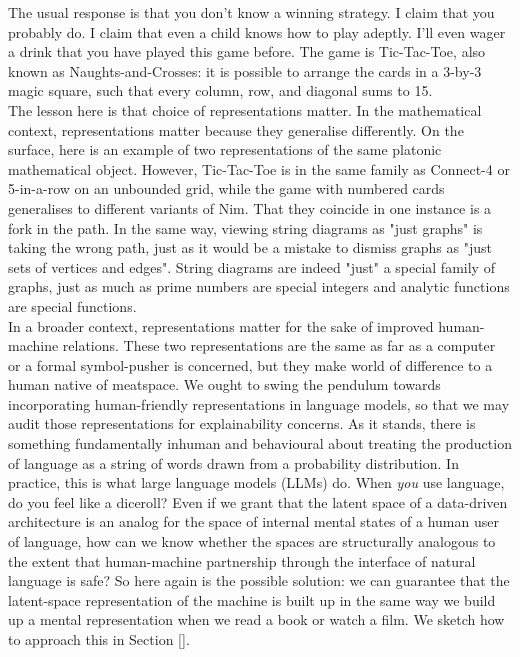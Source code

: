The usual response is that you don't know a winning strategy. I claim that you probably do. I claim that even a child knows how to play adeptly. I'll even wager a drink that you have played this game before. The game is Tic-Tac-Toe, also known as Naughts-and-Crosses: it is possible to arrange the cards in a 3-by-3 magic square, such that every column, row, and diagonal sums to 15.\\

The lesson here is that choice of representations matter. In the mathematical context, representations matter because they generalise differently. On the surface, here is an example of two representations of the same platonic mathematical object. However, Tic-Tac-Toe is in the same family as Connect-4 or 5-in-a-row on an unbounded grid, while the game with numbered cards generalises to different variants of Nim. That they coincide in one instance is a fork in the path. In the same way, viewing string diagrams as "just graphs" is taking the wrong path, just as it would be a mistake to dismiss graphs as "just sets of vertices and edges". String diagrams are indeed "just" a special family of graphs, just as much as prime numbers are special integers and analytic functions are special functions.\\

In a broader context, representations matter for the sake of improved human-machine relations. These two representations are the same as far as a computer or a formal symbol-pusher is concerned, but they make world of difference to a human native of meatspace. We ought to swing the pendulum towards incorporating human-friendly representations in language models, so that we may audit those representations for explainability concerns. As it stands, there is something fundamentally inhuman and behavioural about treating the production of language as a string of words drawn from a probability distribution. In practice, this is what large language models (LLMs) do. When \emph{you} use language, do you feel like a diceroll? Even if we grant that the latent space of a data-driven architecture is an analog for the space of internal mental states of a human user of language, how can we know whether the spaces are structurally analogous to the extent that human-machine partnership through the interface of natural language is safe? So here again is the possible solution: we can guarantee that the latent-space representation of the machine is built up in the same way we build up a mental representation when we read a book or watch a film. We sketch how to approach this in Section \ref{}.

